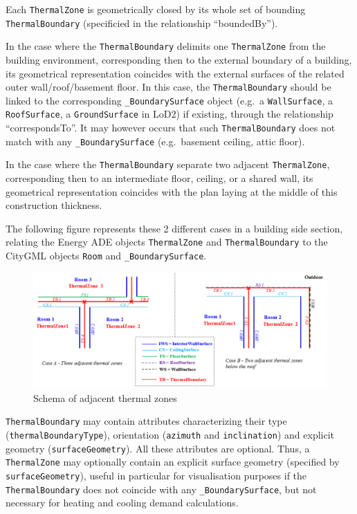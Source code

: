 \documentclass[a4paper,12pt]{article}
\begin{document}
Each \texttt{ThermalZone} is geometrically closed by its whole set of
bounding \texttt{ThermalBoundary} (specificied in the relationship
``boundedBy'').

In the case where the \texttt{ThermalBoundary} delimits one
\texttt{ThermalZone} from the building environment, corresponding then
to the external boundary of a building, its geometrical representation
coincides with the external surfaces of the related outer
wall/roof/basement floor. In this case, the \texttt{ThermalBoundary}
should be linked to the corresponding \texttt{\_BoundarySurface} object
(e.g.~a \texttt{WallSurface}, a \texttt{RoofSurface}, a
\texttt{GroundSurface} in LoD2) if existing, through the relationship
``correspondsTo''. It may however occurs that such
\texttt{ThermalBoundary} does not match with any
\texttt{\_BoundarySurface} (e.g.~basement ceiling, attic floor).

In the case where the \texttt{ThermalBoundary} separate two adjacent
\texttt{ThermalZone}, corresponding then to an intermediate floor,
ceiling, or a shared wall, its geometrical representation coincides with
the plan laying at the middle of this construction thickness.

The following figure represents these 2 different cases in a building
side section, relating the Energy ADE objects \texttt{ThermalZone} and
\texttt{ThermalBoundary} to the CityGML objects \texttt{Room} and
\texttt{\_BoundarySurface}.

\begin{figure}[htbp]
\centering
\includegraphics{fig/ThermalZoneAdjacency.png}
\caption{Schema of adjacent thermal zones}
\end{figure}

\texttt{ThermalBoundary} may contain attributes characterizing their
type\\
(\texttt{thermalBoundaryType}), orientation (\texttt{azimuth} and
\texttt{inclination}) and explicit geometry (\texttt{surfaceGeometry}).
All these attributes are optional. Thus, a \texttt{ThermalZone} may
optionally contain an explicit surface geometry (specified by
\texttt{surfaceGeometry}), useful in particular for visualisation
purposes if the \texttt{ThermalBoundary} does not coincide with any
\texttt{\_BoundarySurface}, but not necessary for heating and cooling
demand calculations.
\end{document}
